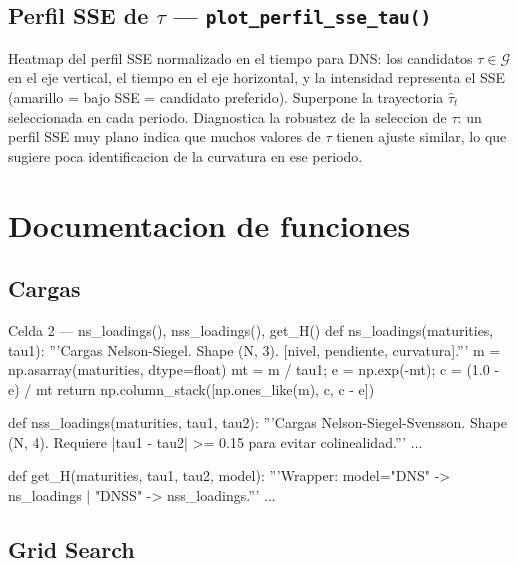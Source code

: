 \documentclass[12pt, a4paper]{article}
\theoremstyle{plain}
\theoremstyle{definition}
\theoremstyle{remark}
\begin{document}
\subsection{Perfil SSE de $\tau$ --- \texttt{plot\_perfil\_sse\_tau()}}

Heatmap del perfil SSE normalizado en el tiempo para DNS:
los candidatos $\tau \in \mathcal{G}$ en el eje vertical,
el tiempo en el eje horizontal, y la intensidad representa el SSE
(amarillo = bajo SSE = candidato preferido).
Superpone la trayectoria $\hat{\tau}_t$ seleccionada en cada periodo.
Diagnostica la robustez de la seleccion de $\tau$: un perfil SSE
muy plano indica que muchos valores de $\tau$ tienen ajuste similar,
lo que sugiere poca identificacion de la curvatura en ese periodo.

\section{Documentacion de funciones}
\label{sec:funciones}

\subsection{Cargas}

\begin{codigocaja}{Celda 2 --- ns\_loadings(), nss\_loadings(), get\_H()}
def ns_loadings(maturities, tau1):
    '''Cargas Nelson-Siegel. Shape (N, 3). [nivel, pendiente, curvatura].'''
    m  = np.asarray(maturities, dtype=float)
    mt = m / tau1; e = np.exp(-mt); c = (1.0 - e) / mt
    return np.column_stack([np.ones_like(m), c, c - e])

def nss_loadings(maturities, tau1, tau2):
    '''Cargas Nelson-Siegel-Svensson. Shape (N, 4).
    Requiere |tau1 - tau2| >= 0.15 para evitar colinealidad.'''
    ...

def get_H(maturities, tau1, tau2, model):
    '''Wrapper: model="DNS" -> ns_loadings | "DNSS" -> nss_loadings.'''
    ...
\end{codigocaja}

\subsection{Grid Search}
\end{document}
